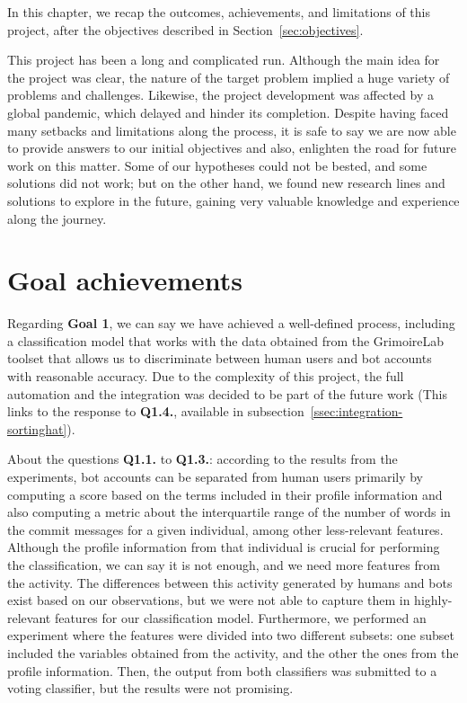 \documentclass[a4paper, 12pt]{book}
\begin{document}
In this chapter, we recap the outcomes, achievements, and limitations of this project, after the objectives described in Section~\ref{sec:objectives}.

This project has been a long and complicated run. Although the main idea for the project was clear, the nature of the target problem implied a huge variety of problems and challenges. Likewise, the project development was affected by a global pandemic, which delayed and hinder its completion. Despite having faced many setbacks and limitations along the process, it is safe to say we are now able to provide answers to our initial objectives and also, enlighten the road for future work on this matter. Some of our hypotheses could not be bested, and some solutions did not work; but on the other hand, we found new research lines and solutions to explore in the future, gaining very valuable knowledge and experience along the journey.

\section{Goal achievements}
\label{sec:goal-achievements}

Regarding \textbf{Goal 1}, we can say we have achieved a well-defined process, including a classification model that works with the data obtained from the GrimoireLab toolset that allows us to discriminate between human users and bot accounts with reasonable accuracy. Due to the complexity of this project, the full automation and the integration was decided to be part of the future work (This links to the response to \textbf{Q1.4.}, available in subsection~\ref{ssec:integration-sortinghat}).

About the questions \textbf{Q1.1. }to \textbf{Q1.3.}: according to the results from the experiments, bot accounts can be separated from human users primarily by computing a score based on the terms included in their profile information and also computing a metric about the interquartile range of the number of words in the commit messages for a given individual, among other less-relevant features. Although the profile information from that individual is crucial for performing the classification, we can say it is not enough, and we need more features from the activity. The differences between this activity generated by humans and bots exist based on our observations, but we were not able to capture them in highly-relevant features for our classification model. Furthermore, we performed an experiment where the features were divided into two different subsets: one subset included the variables obtained from the activity, and the other the ones from the profile information. Then, the output from both classifiers was submitted to a voting classifier, but the results were not promising.
\end{document}
